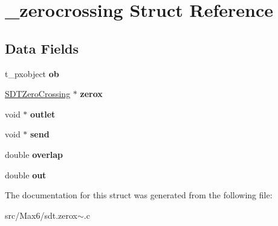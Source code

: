 \hypertarget{struct__zerocrossing}{}\section{\+\_\+zerocrossing Struct Reference}
\label{struct__zerocrossing}
\subsection*{Data Fields}
\begin{DoxyCompactItemize}
\item 
\hypertarget{struct__zerocrossing_a55b4380edb216f04a1c42b9095594963}{}t\+\_\+pxobject {\bfseries ob}\label{struct__zerocrossing_a55b4380edb216f04a1c42b9095594963}

\item 
\hypertarget{struct__zerocrossing_a5a18b186a339056e7be5e55586c3c48a}{}\hyperlink{struct_s_d_t_zero_crossing}{S\+D\+T\+Zero\+Crossing} $\ast$ {\bfseries zerox}\label{struct__zerocrossing_a5a18b186a339056e7be5e55586c3c48a}

\item 
\hypertarget{struct__zerocrossing_a93c137f2e56e2bd3ce84cf8bf5ac0946}{}void $\ast$ {\bfseries outlet}\label{struct__zerocrossing_a93c137f2e56e2bd3ce84cf8bf5ac0946}

\item 
\hypertarget{struct__zerocrossing_ab82783be31120644484d68f0f0f03615}{}void $\ast$ {\bfseries send}\label{struct__zerocrossing_ab82783be31120644484d68f0f0f03615}

\item 
\hypertarget{struct__zerocrossing_aeb5a494cce1f67b74810ff267f256b9c}{}double {\bfseries overlap}\label{struct__zerocrossing_aeb5a494cce1f67b74810ff267f256b9c}

\item 
\hypertarget{struct__zerocrossing_af6f4cafc00cee94f00e07fce79a1e1d9}{}double {\bfseries out}\label{struct__zerocrossing_af6f4cafc00cee94f00e07fce79a1e1d9}

\end{DoxyCompactItemize}


The documentation for this struct was generated from the following file\+:\begin{DoxyCompactItemize}
\item 
src/\+Max6/sdt.\+zerox$\sim$.\+c\end{DoxyCompactItemize}
